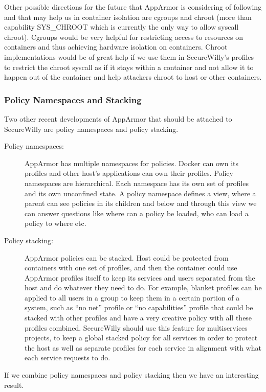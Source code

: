 Other possible directions for the future that AppArmor is considering of following and that may help us in container isolation are cgroups and chroot (more than capability SYS\_CHROOT which is currently the only way to allow syscall chroot). Cgroups would be very helpful for restricting access to resources on containers and thus achieving hardware isolation on containers. Chroot implementations would be of great help if we use them in SecureWilly's profiles to restrict the chroot syscall as if it stays within a container and not allow it to happen out of the container and help attackers chroot to host or other containers.

\subsubsection{Policy Namespaces and Stacking}
Two other recent developments of AppArmor that should be attached to SecureWilly are policy namespaces and policy stacking. \cite{app3suse}
\begin{description}
\item[Policy namespaces:] AppArmor has multiple namespaces for policies. Docker can own its profiles and other host's applications can own their profiles. Policy namespaces are hierarchical.  Each namespace has its own set of profiles and its own unconfined state. A policy namespace defines a view, where a parent can see policies in its children and below and through this view we can answer questions like where can a policy be loaded, who can load a policy to where etc. 

\item[Policy stacking:] AppArmor policies can be stacked. Host could be protected from containers with one set of profiles, and then the container could use AppArmor profiles itself to keep its services and users separated from the host and do whatever they need to do. For example, blanket profiles can be applied to all users in a group to keep them in a certain portion of a system, such as “no net” profile or “no capabilities” profile that could be stacked with other profiles and have a very creative policy with all these profiles combined. SecureWilly should use this feature for multiservices projects, to keep a global stacked policy for all services in order to protect the host as well as separate profiles for each service in alignment with what each service requests to do.
\end{description}

If we combine policy namespaces and policy stacking then we have an interesting result.

